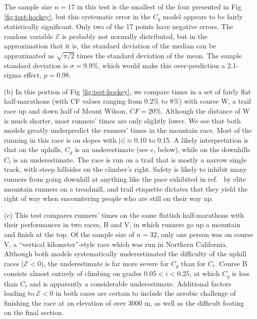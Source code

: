 \documentclass[10pt,letterpaper]{article}
\begin{document}
The sample size $n=17$ in this test is the smallest of the four presented in Fig \ref{fig:test-hockey},
but this systematic error in the $C_g$ model appears to be fairly statistically significant. Only
two of the 17 points have negative errors. The random variable $\mathcal{E}$ is probably not normally
distributed, but in the approximation that it is, the standard deviation of the median can be approximated
as $\sqrt{\pi/2}$ times the standard deviation of the mean. The sample standard deviation is $\sigma=9.9\%$,
which would make this over-prediction a 2.1-sigma effect, $p=0.98$.

(b) In this portion of Fig \ref{fig:test-hockey}, we compare times in a set of fairly flat half-marathons
(with CF values ranging from 0.2\% to 8\%) with course W, a trail race up and down half of Mount Wilson, $CF=20\%$.
Although the distance of W is much shorter, most runners' times are only slightly lower. We see that both
models greatly underpredict the runners' times in the mountain race. Most of the running in this race is
on slopes with $|i|\approx 0.10$ to 0.15. A likely interpretation is that on the uphills, $C_g$ is an
underestimate (see c, below), while on the downhills $C_t$ is an underestimate. The race is run on a trail that is
mostly a narrow single track, with steep hillsides on the climber's right. Safety is likely to inhibit
many runners from going downhill at anything like the pace exhibited in ref.~\cite{minetti} by elite mountain runners
on a treadmill, and trail etiquette dictates that they yield the right of way when encountering
people who are still on their way up.

(c) This test compares runners' times on the same flattish half-marathons with their performances in
two races, B and V, in which runners go up a mountain and finish at the top. Of the sample size of $n=32$, only
one person was on course V, a ``vertical kilometer''-style race which was run in Northern California.
Although both models systematically underestimated the difficulty of the uphill races ($\mathcal{E}<0$),
the underestimate is far more severe for $C_g$ than for $C_t$. Course B consists almost
entirely of climbing on grades $0.05<i<0.25$, at which $C_g$ is less than $C_t$ and is apparently a
considerable underestimate. Additional factors leading to $\mathcal{E}<0$ in both cases
are certain to include the aerobic challenge of finishing the race at an elevation of over 3000 m,
as well as the difficult footing on the final section.
\end{document}
